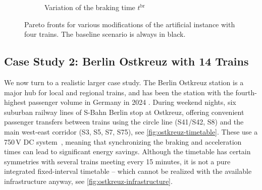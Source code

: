 \documentclass[11pt,a4paper]{article}
\newcommand{\br}{\mathrm{br}}
\theoremstyle{definition}
\theoremstyle{remark}
\begin{document}
\begin{figure}[p]
\begin{subfigure}{0.49\linewidth}
        \caption{Variation of the braking time $t^\br$}
        \label{fig:mini-pareto-br}
    \end{subfigure}
    \caption{Pareto fronts for various modifications of the artificial instance with four trains. The baseline scenario is always in black.}
    \label{fig:mini-pareto}
\end{figure}


\subsection{Case Study 2: Berlin Ostkreuz with 14 Trains}

We now turn to a realistic larger case study. The Berlin Ostkreuz station is a major hub for local and regional trains, and has been the station with the fourth-highest passenger volume in Germany in 2024 \cite{ostkreuz_anfrage}. During weekend nights, six suburban railway lines of S-Bahn Berlin stop at Ostkreuz, offering convenient passenger transfers between trains using the circle line (S41/S42, S8) and the main west-east corridor (S3, S5, S7, S75), see \cref{fig:ostkreuz-timetable}. These use a 750\,V DC system~\cite{s-bahn}, meaning that synchronizing the braking and acceleration times can lead to significant energy savings. Although the timetable has certain symmetries with several trains meeting every 15 minutes, it is not a pure integrated fixed-interval timetable -- which cannot be realized with the available infrastructure anyway, see \cref{fig:ostkreuz-infrastructure}.
\end{document}
